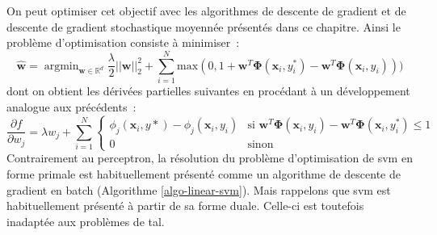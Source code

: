 \documentclass[11pt,openany]{book}
\newcommand{\ac}[1]{{\sc #1}} %
\begin{document}
On peut optimiser cet objectif avec les
algorithmes de descente de gradient et de descente de gradient
stochastique moyennée présentés dans ce chapitre. Ainsi le problème
d'optimisation consiste à minimiser~:
\begin{equation}
\hat{\mathbf{w}}=\mathop{\text{argmin}}_{\mathbf{w} \in \mathbb{R}^d}
\frac{\lambda}{2}||\mathbf{w}||_2^2+\sum_{i=1}^N
\text{max}(0,
1+\mathbf{w}^T\boldsymbol\Phi(\mathbf{x}_i,y^*_i) - \mathbf{w}^T\boldsymbol\Phi(\mathbf{x}_i,y_i) ))
\end{equation}
dont on obtient les dérivées partielles suivantes en procédant à un
développement analogue aux précédents~:
\begin{equation}
\frac{\partial f}{\partial w_j} = \lambda w_j+\sum_{i=1}^N
\left\{
\begin{array}{ll}
\phi_j(\mathbf{x}_i,y*) - \phi_j(\mathbf{x}_i,y_i) & \text{si }  
\mathbf{w}^T\boldsymbol\Phi(\mathbf{x}_i,y_i)   - \mathbf{w}^T\boldsymbol\Phi(\mathbf{x}_i,y^*_i) \leq 1\\
0&\text{sinon}
\end{array}\right.
\end{equation}
Contrairement au perceptron, la résolution du problème d'optimisation
de \ac{svm} en forme primale est
habituellement présenté comme un  algorithme de descente de gradient en batch
(Algorithme \ref{algo-linear-svm}). Mais rappelons que \ac{svm} est
habituellement présenté à partir de sa forme duale.  Celle-ci est
toutefois inadaptée
aux problèmes de \ac{tal}. 

\begin{center}

\end{center}
\end{document}
